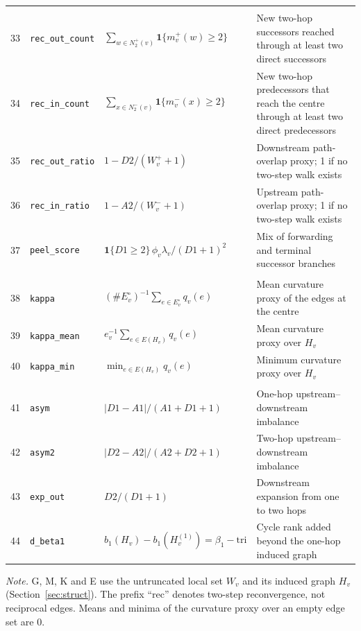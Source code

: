 \begin{table}[htbp]
\begin{threeparttable}
\begin{tabular}{@{}rL{3.05cm}L{4.6cm}L{6.6cm}@{}}
\addlinespace
{} \\
33 & \texttt{rec\_out\_count} & $\sum_{w\in N_2^{+}(v)}\mathbf{1}\{m_v^{+}(w)\ge2\}$ & New two-hop successors reached through at least two direct successors \\
34 & \texttt{rec\_in\_count} & $\sum_{x\in N_2^{-}(v)}\mathbf{1}\{m_v^{-}(x)\ge2\}$ & New two-hop predecessors that reach the centre through at least two direct predecessors \\
35 & \texttt{rec\_out\_ratio} & $1-D2/(W_v^{+}+1)$ & Downstream path-overlap proxy; 1 if no two-step walk exists \\
36 & \texttt{rec\_in\_ratio} & $1-A2/(W_v^{-}+1)$ & Upstream path-overlap proxy; 1 if no two-step walk exists \\
37 & \texttt{peel\_score} & $\mathbf{1}\{D1\ge2\}\,\phi_v\lambda_v/(D1+1)^2$ & Mix of forwarding and terminal successor branches \\
\addlinespace
{} \\
38 & \texttt{kappa} & $(\#E_v^{\circ})^{-1}\sum_{e\in E_v^{\circ}}q_v(e)$ & Mean curvature proxy of the edges at the centre \\
39 & \texttt{kappa\_mean} & $e_v^{-1}\sum_{e\in E(H_v)}q_v(e)$ & Mean curvature proxy over $H_v$ \\
40 & \texttt{kappa\_min} & $\min_{e\in E(H_v)}q_v(e)$ & Minimum curvature proxy over $H_v$ \\
\addlinespace
{} \\
41 & \texttt{asym} & $|D1-A1|/(A1+D1+1)$ & One-hop upstream--downstream imbalance \\
42 & \texttt{asym2} & $|D2-A2|/(A2+D2+1)$ & Two-hop upstream--downstream imbalance \\
43 & \texttt{exp\_out} & $D2/(D1+1)$ & Downstream expansion from one to two hops \\
44 & \texttt{d\_beta1} & $b_1(H_v)-b_1(H_v^{(1)})=\beta_1-\mathrm{tri}$ & Cycle rank added beyond the one-hop induced graph \\
\bottomrule
\end{tabular}
\begin{tablenotes}[flushleft]
\footnotesize
\setlength{\labelsep}{0pt}\item[] \textit{Note.} G, M, K and E use the untruncated local set $W_v$ and its induced graph $H_v$ (Section~\ref{sec:struct}). The prefix ``rec'' denotes two-step reconvergence, not reciprocal edges. Means and minima of the curvature proxy over an empty edge set are 0.
\end{tablenotes}
\end{threeparttable}
\end{table}
